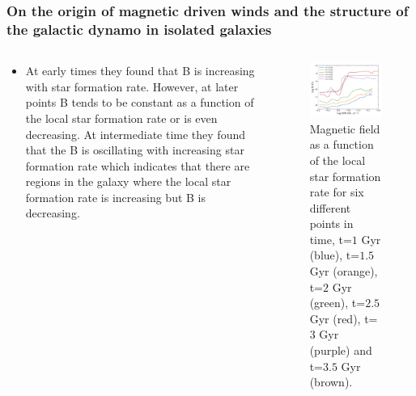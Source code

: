 \documentclass[10pt,aspectratio=169]{beamer}
\begin{document}
\begin{frame}
	\frametitle{ On the origin of magnetic driven winds and the structure of the galactic dynamo in isolated galaxies \citep{2020MNRAS.494.4393S}}
	\begin{columns}
		\begin{column}{0.52\textwidth}
			\begin{itemize}
				\item At early times they found that B is increasing with star formation rate. However, at later points B tends to be constant as a function of the local star formation rate or is even decreasing. At intermediate time they found that the B is oscillating with increasing star formation rate which indicates that there are regions in the galaxy where the local star formation rate is increasing but B is decreasing.
			\end{itemize}
		\end{column}
		\begin{column}{0.46\textwidth}
			\begin{figure}
				\includegraphics[width=1.1\textwidth,trim= 0 20 0 0]{./images/sfr_b_new.pdf}
				\caption{Magnetic field as a function of the local star formation rate for six different points in time, t=$1$ Gyr (blue), t=$1.5$ Gyr (orange), t=$2$ Gyr (green),  t=$2.5$ Gyr (red),  t=$3$ Gyr (purple) and t=$3.5$ Gyr (brown).}
			\end{figure}
		\end{column}
	\end{columns}
\end{frame}
\end{document}
